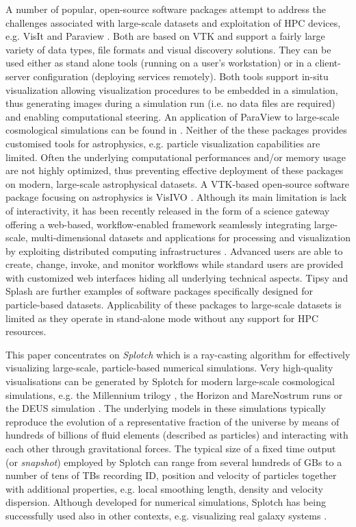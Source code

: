\documentclass[1p]{elsarticle}
\begin{document}
A number of popular, open-source software packages attempt to address the challenges associated with large-scale datasets and exploitation of HPC devices, e.g. VisIt \cite{visit} and Paraview \cite{paraview}. Both are based on VTK \cite{vtk} and support a fairly large variety of data types, file formats and visual discovery solutions. They can be used either as stand alone tools (running on a user's workstation) or in a client-server configuration (deploying services remotely). Both tools support in-situ visualization allowing visualization procedures to be embedded in a simulation, thus generating images during a simulation run (i.e. no data files are required) and enabling computational steering. An application of ParaView to large-scale cosmological simulations can be found in \cite{2011ApJS..195...11W}. Neither of the these packages provides customised tools for astrophysics,  e.g. particle visualization capabilities are limited. Often the underlying computational performances and/or memory usage are not highly optimized, thus preventing effective deployment of these packages on modern, large-scale astrophysical datasets. A VTK-based open-source software package focusing on astrophysics is VisIVO \cite{}. Although its main limitation is lack of interactivity, it has been recently released in the form of a science gateway offering a web-based, workflow-enabled framework seamlessly integrating large-scale, multi-dimensional datasets and applications for processing and visualization by exploiting distributed computing infrastructures \cite{}. Advanced users are able to create, change, invoke, and monitor workflows while standard users are provided with customized web interfaces hiding all underlying technical aspects. Tipsy \cite{tipsyurl} and Splash \cite{splash} are further examples of software packages specifically designed for particle-based datasets. Applicability of these packages to large-scale datasets is limited as they operate in stand-alone mode without any support for HPC resources.

This paper concentrates on {\it Splotch} \cite{2008NJPh...10l5006D} which is a ray-casting algorithm for effectively visualizing large-scale, particle-based numerical simulations. Very high-quality visualisations can be generated by Splotch for modern large-scale cosmological simulations, e.g. the Millennium trilogy \cite{millennium}, the Horizon and MareNostrum runs \cite{horizon} or the DEUS simulation \cite{deus}. The underlying models in these simulations typically reproduce the evolution of a representative fraction of the universe by means of hundreds of billions of fluid elements (described as particles) and interacting with each other through gravitational forces. The typical size of a fixed time output (or {\it snapshot}) employed by Splotch can range from several hundreds of GBs to a number of tens of TBs recording ID, position and velocity of particles together with additional properties, e.g. local smoothing length, density and velocity dispersion. Although developed for numerical simulations, Splotch has being successfully used 
also in other contexts, e.g. visualizing real galaxy systems \cite{}.
\end{document}
